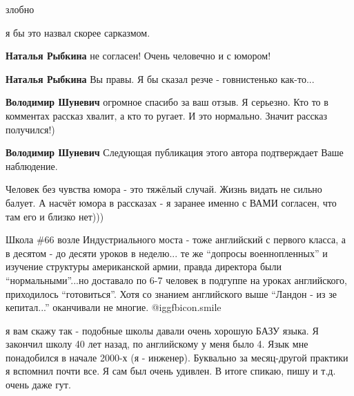  
 
 
 
 
\zzSecCmt

\begin{itemize} %
злобно

\begin{itemize} %
я бы это назвал скорее сарказмом.

\textbf{Наталья Рыбкина} не согласен! Очень человечно и с юмором!

\textbf{Наталья Рыбкина} Вы правы. Я бы сказал резче - говнистенько как-то...

\textbf{Володимир Шуневич} огромное спасибо за ваш отзыв. Я серьезно. Кто то в комментах рассказ хвалит, а кто то ругает. И это нормально. Значит рассказ получился!)

\textbf{Володимир Шуневич} Следующая публикация этого автора подтверждает Ваше наблюдение.


Человек без чувства юмора - это тяжёлый случай. Жизнь видать не сильно балует.
А насчёт юмора в рассказах - я заранее именно с ВАМИ согласен, что там его и
близко нет)))

\end{itemize} %


Школа \#66 возле Индустриального моста - тоже английский с первого класса, а в
десятом - до десяти уроков в неделю... те же \enquote{допросы военнопленных} и изучение
структуры американской армии, правда директора были \enquote{нормальными}...но доставало
по 6-7 человек в подгуппе на уроках английского, приходилось \enquote{готовиться}. Хотя
со знанием английского выше \enquote{Ландон - из зе кепитал...} оканчивали не многие. @igg{fbicon.smile} 

\begin{itemize} %

я вам скажу так - подобные школы давали очень хорошую БАЗУ языка. Я закончил
школу 40 лет назад, по английскому у меня было 4. Язык мне понадобился в начале
2000-х (я - инженер). Буквально за месяц-другой практики я вспомнил почти все.
Я сам был очень удивлен. В итоге спикаю, пишу и т.д. очень даже гут.



\end{itemize}
\end{itemize}
